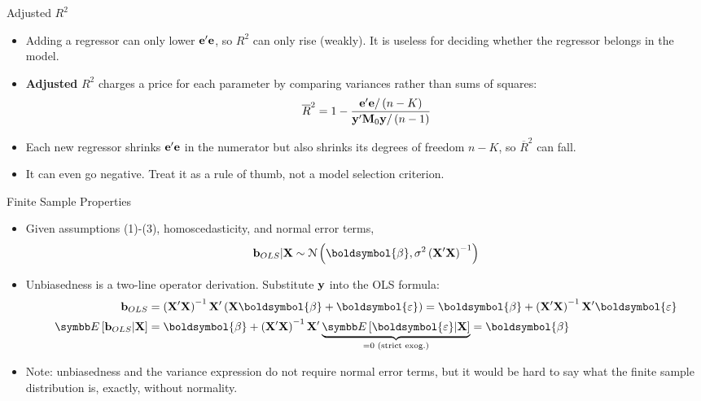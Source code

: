 \documentclass[aspectratio=169,11pt]{beamer}
\begin{document}
\begin{frame}{Adjusted $R^{2}$}
\begin{itemize}
	\item Adding a regressor can only lower ${\bf e}'{\bf e}$, so $R^{2}$ can only rise (weakly).
	It is useless for deciding whether the regressor belongs in the model.

	\medskip
	\item {\bf Adjusted} $R^{2}$ charges a price for each parameter by comparing
	variances rather than sums of squares:\[
	\overline{R}^{2} 	= 1 -  \frac{{\bf e}'{\bf e}/\left(n-K\right)}{{\bf y}'{\bf M}_{0}{\bf y}/\left(n-1\right)}
	\]

	\medskip
	\item Each new regressor shrinks ${\bf e}'{\bf e}$ in the numerator but also shrinks its
	degrees of freedom $n-K$, so $\overline{R}^{2}$ can fall.

	\medskip
	\item It can even go negative. Treat it as a rule of thumb, not a model selection
	criterion.
\end{itemize}
\end{frame}




\begin{frame}{Finite Sample Properties}
\begin{itemize}
	\item Given assumptions (1)-(3), homoscedasticity, and normal error terms, \[
	{\bf b}_{OLS} | {\bf X} \sim \mathcal{N}\left(\boldsymbol{\beta},\sigma^{2} \left({\bf X}'{\bf X}  \right)^{-1} \right)
	\]

	\item Unbiasedness is a two-line operator derivation. Substitute ${\bf y}$ into the OLS formula:
	\begin{align*}
		{\bf b}_{OLS} &= \left({\bf X}'{\bf X}\right)^{-1}{\bf X}'\left({\bf X}\boldsymbol{\beta} + \boldsymbol{\varepsilon}\right)
		= \boldsymbol{\beta} + \left({\bf X}'{\bf X}\right)^{-1}{\bf X}'\boldsymbol{\varepsilon}\\
		\E\left[{\bf b}_{OLS}|{\bf X}\right] &= \boldsymbol{\beta} + \left({\bf X}'{\bf X}\right)^{-1}{\bf X}'\underbrace{\E\left[\boldsymbol{\varepsilon}|{\bf X}\right]}_{=0 \text{ (strict exog.)}} = \boldsymbol{\beta}
	\end{align*}

	\item Note: unbiasedness and the variance expression
	do not require normal error terms, but it would be hard to say what the finite sample
	distribution is, exactly, without normality.

\end{itemize}
\end{frame}
\end{document}
